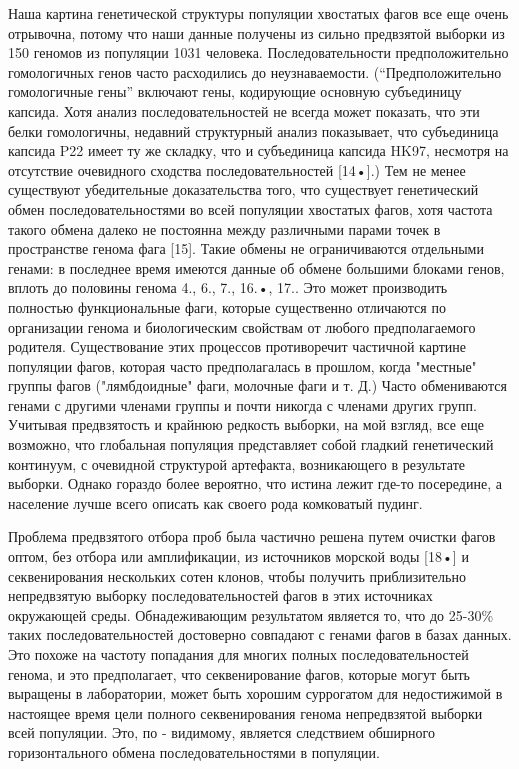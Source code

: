 \documentclass[a4paper,12pt]{article}
\begin{document}
    \par{Наша картина генетической структуры популяции хвостатых фагов все еще очень отрывочна, потому что наши данные
    получены из сильно предвзятой выборки из 150 геномов из популяции 1031 человека. Последовательности предположительно
    гомологичных генов часто расходились до неузнаваемости. (“Предположительно гомологичные гены” включают гены,
    кодирующие основную субъединицу капсида. Хотя анализ последовательностей не всегда может показать, что эти белки
    гомологичны, недавний структурный анализ показывает, что субъединица капсида P22 имеет ту же складку, что и
    субъединица капсида HK97, несмотря на отсутствие очевидного сходства последовательностей [14•].) Тем не менее
    существуют убедительные доказательства того, что существует генетический обмен последовательностями во всей
    популяции хвостатых фагов, хотя частота такого обмена далеко не постоянна между различными парами точек в
    пространстве генома фага [15]. Такие обмены не ограничиваются отдельными генами: в последнее время имеются данные об
    обмене большими блоками генов, вплоть до половины генома 4., 6., 7., 16.•, 17.. Это может производить полностью
    функциональные фаги, которые существенно отличаются по организации генома и биологическим свойствам от любого
    предполагаемого родителя. Существование этих процессов противоречит частичной картине популяции фагов, которая часто
    предполагалась в прошлом, когда "местные" группы фагов ("лямбдоидные" фаги, молочные фаги и т. Д.) Часто
    обмениваются генами с другими членами группы и почти никогда с членами других групп. Учитывая предвзятость и крайнюю
    редкость выборки, на мой взгляд, все еще возможно, что глобальная популяция представляет собой гладкий генетический
    континуум, с очевидной структурой артефакта, возникающего в результате выборки. Однако гораздо более вероятно, что
    истина лежит где-то посередине, а население лучше всего описать как своего рода комковатый пудинг.}
    
    \par{Проблема предвзятого отбора проб была частично решена путем очистки фагов оптом, без отбора или амплификации,
    из источников морской воды [18•] и секвенирования нескольких сотен клонов, чтобы получить приблизительно
    непредвзятую выборку последовательностей фагов в этих источниках окружающей среды. Обнадеживающим результатом
    является то, что до 25-30\% таких последовательностей достоверно совпадают с генами фагов в базах данных. Это похоже
    на частоту попадания для многих полных последовательностей генома, и это предполагает, что секвенирование фагов,
    которые могут быть выращены в лаборатории, может быть хорошим суррогатом для недостижимой в настоящее время цели
    полного секвенирования генома непредвзятой выборки всей популяции. Это, по - видимому, является следствием обширного
    горизонтального обмена последовательностями в популяции.}
    
\end{document}
